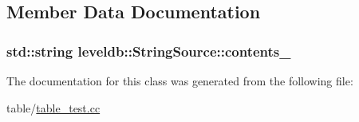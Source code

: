 \subsection{Member Data Documentation}
\hypertarget{classleveldb_1_1_string_source_afd2a04d238d79fbe4087b30f8d9b4675}{
\subsubsection[{contents\-\_\-}]{\setlength{\rightskip}{0pt plus 5cm}std\-::string leveldb\-::\-String\-Source\-::contents\-\_\-\hspace{0.3cm}{\ttfamily [private]}}}\label{classleveldb_1_1_string_source_afd2a04d238d79fbe4087b30f8d9b4675}


The documentation for this class was generated from the following file\-:\begin{DoxyCompactItemize}
\item 
table/\hyperlink{table__test_8cc}{table\-\_\-test.\-cc}\end{DoxyCompactItemize}

